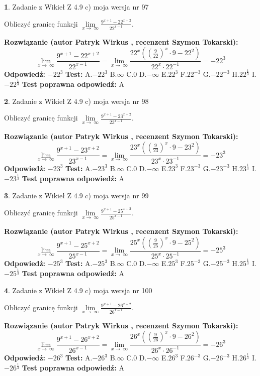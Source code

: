 \documentclass[12pt, a4paper]{article}
\theoremstyle{definition} %
\newtheorem{zad}{}
\newcommand{\zadStart}[1]{\begin{zad}#1\newline}
\newcommand{\zadStop}{\end{zad}}
\newcommand{\rozwStart}[2]{\noindent \textbf{Rozwiązanie (autor #1 , recenzent #2): }\newline}
\newcommand{\rozwStop}{\newline}
\newcommand{\odpStart}{\noindent \textbf{Odpowiedź:}\newline}
\newcommand{\odpStop}{\newline}
\newcommand{\testStart}{\noindent \textbf{Test:}\newline}
\newcommand{\testStop}{\newline}
\newcommand{\kluczStart}{\noindent \textbf{Test poprawna odpowiedź:}\newline}
\newcommand{\kluczStop}{\newline}
\begin{document}
\zadStart{Zadanie z Wikieł Z 4.9 c) moja wersja nr 97}


Obliczyć granicę funkcji  $\lim\limits_{x\to\ \infty}\frac{9^{x+1}-22^{x+2}}{22^{x-1}}$.
\zadStop
\rozwStart{Patryk Wirkus}{Szymon Tokarski}
$$\lim\limits_{x\to\ \infty}\frac{9^{x+1}-22^{x+2}}{22^{x-1}}=\lim\limits_{x\to\ \infty}\frac{22^{x}((\frac{9}{22})^{x}\cdot 9 -22^{2})}{22^{x}\cdot 22^{-1}} = -22^{3}$$
\rozwStop
\odpStart
$-22^{3}$
\odpStop
\testStart
A.$-22^{3}$ B.$\infty$ C.$0$ D.$-\infty$ E.$22^{3}$
F.$22^{-3}$ G.$-22^{-3}$
H.$22^{\frac{1}{3}}$
I.$-22^{\frac{1}{3}}$
\testStop
\kluczStart
A
\kluczStop



\zadStart{Zadanie z Wikieł Z 4.9 c) moja wersja nr 98}


Obliczyć granicę funkcji  $\lim\limits_{x\to\ \infty}\frac{9^{x+1}-23^{x+2}}{23^{x-1}}$.
\zadStop
\rozwStart{Patryk Wirkus}{Szymon Tokarski}
$$\lim\limits_{x\to\ \infty}\frac{9^{x+1}-23^{x+2}}{23^{x-1}}=\lim\limits_{x\to\ \infty}\frac{23^{x}((\frac{9}{23})^{x}\cdot 9 -23^{2})}{23^{x}\cdot 23^{-1}} = -23^{3}$$
\rozwStop
\odpStart
$-23^{3}$
\odpStop
\testStart
A.$-23^{3}$ B.$\infty$ C.$0$ D.$-\infty$ E.$23^{3}$
F.$23^{-3}$ G.$-23^{-3}$
H.$23^{\frac{1}{3}}$
I.$-23^{\frac{1}{3}}$
\testStop
\kluczStart
A
\kluczStop



\zadStart{Zadanie z Wikieł Z 4.9 c) moja wersja nr 99}


Obliczyć granicę funkcji  $\lim\limits_{x\to\ \infty}\frac{9^{x+1}-25^{x+2}}{25^{x-1}}$.
\zadStop
\rozwStart{Patryk Wirkus}{Szymon Tokarski}
$$\lim\limits_{x\to\ \infty}\frac{9^{x+1}-25^{x+2}}{25^{x-1}}=\lim\limits_{x\to\ \infty}\frac{25^{x}((\frac{9}{25})^{x}\cdot 9 -25^{2})}{25^{x}\cdot 25^{-1}} = -25^{3}$$
\rozwStop
\odpStart
$-25^{3}$
\odpStop
\testStart
A.$-25^{3}$ B.$\infty$ C.$0$ D.$-\infty$ E.$25^{3}$
F.$25^{-3}$ G.$-25^{-3}$
H.$25^{\frac{1}{3}}$
I.$-25^{\frac{1}{3}}$
\testStop
\kluczStart
A
\kluczStop



\zadStart{Zadanie z Wikieł Z 4.9 c) moja wersja nr 100}


Obliczyć granicę funkcji  $\lim\limits_{x\to\ \infty}\frac{9^{x+1}-26^{x+2}}{26^{x-1}}$.
\zadStop
\rozwStart{Patryk Wirkus}{Szymon Tokarski}
$$\lim\limits_{x\to\ \infty}\frac{9^{x+1}-26^{x+2}}{26^{x-1}}=\lim\limits_{x\to\ \infty}\frac{26^{x}((\frac{9}{26})^{x}\cdot 9 -26^{2})}{26^{x}\cdot 26^{-1}} = -26^{3}$$
\rozwStop
\odpStart
$-26^{3}$
\odpStop
\testStart
A.$-26^{3}$ B.$\infty$ C.$0$ D.$-\infty$ E.$26^{3}$
F.$26^{-3}$ G.$-26^{-3}$
H.$26^{\frac{1}{3}}$
I.$-26^{\frac{1}{3}}$
\testStop
\kluczStart
A
\kluczStop
\end{document}
